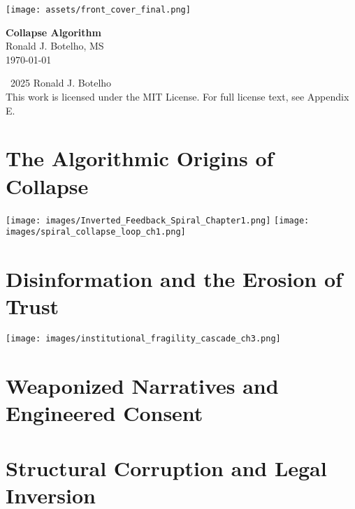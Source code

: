 \documentclass[12pt]{book}
\begin{document}
\begin{titlepage}
    \centering
    \vspace*{2cm}
    \texttt{[image: assets/front\_cover\_final.png]} \\
    \vspace*{1.5cm}
\end{titlepage}

\begin{titlepage}
    \centering
    {\Huge\bfseries Collapse Algorithm} \\[1cm]
    {\Large Ronald J. Botelho, MS} \\[0.5cm]
    \vfill
    {\large \today}
\end{titlepage}

\newpage
\thispagestyle{empty}
\mbox{}

\newpage
\thispagestyle{empty}
\begin{center}
    \textcopyright~2025 Ronald J. Botelho \\[1ex]
    This work is licensed under the MIT License. For full license text, see Appendix E.
\end{center}

\newpage
\tableofcontents
\newpage

\chapter{The Algorithmic Origins of Collapse}
\label{chap:introduction}
\texttt{[image: images/Inverted\_Feedback\_Spiral\_Chapter1.png]}
\texttt{[image: images/spiral\_collapse\_loop\_ch1.png]}


\chapter{Disinformation and the Erosion of Trust}
\texttt{[image: images/institutional\_fragility\_cascade\_ch3.png]}


\chapter{Weaponized Narratives and Engineered Consent}


\chapter{Structural Corruption and Legal Inversion}

\end{document}
